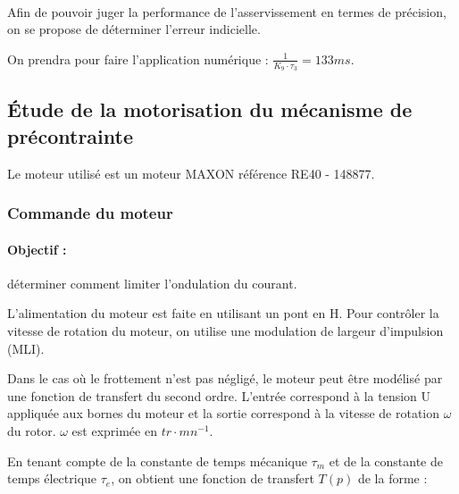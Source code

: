 ~\

Afin de pouvoir juger la performance de l'asservissement en termes de précision, on se propose de déterminer l'erreur indicielle.

On prendra pour faire l'application numérique : $\frac{1}{K_9\cdot \tau_3}= 133ms$.




\subsection{Étude de la motorisation du mécanisme de précontrainte}

Le moteur utilisé est un moteur MAXON référence RE40 - 148877.

\subsubsection{Commande du moteur}

\paragraph{Objectif :} déterminer comment limiter l'ondulation du courant.

L'alimentation du moteur est faite en utilisant un pont en H. Pour contrôler la vitesse de rotation du moteur, on utilise une modulation de largeur d'impulsion (MLI).

Dans le cas où le frottement n'est pas négligé, le moteur peut être modélisé par une fonction de transfert du second ordre. L'entrée correspond à la tension U appliquée aux bornes du moteur et la sortie correspond à la vitesse de rotation $\omega$ du rotor. $\omega$ est exprimée en $tr\cdot mn^{-1}$.

En tenant compte de la constante de temps mécanique $\tau_m$ et de la constante de temps électrique $\tau_e$, on obtient une fonction de transfert $T(p)$ de la forme :

